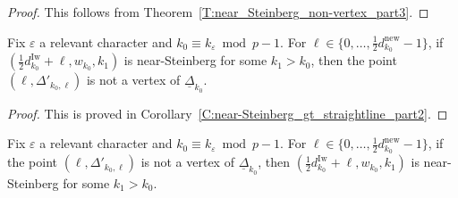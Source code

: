 \begin{proof}
    This follows from Theorem~\ref{T:near_Steinberg_non-vertex_part3}.
\end{proof}

\begin{proposition}
    \label{P:vertices_of_Deltak_part1}
    Fix $\varepsilon$ a relevant character and $k_0 \equiv k_\varepsilon \bmod p-1$.
    For $\ell \in\{0, \dots, \frac12d_{k_0}^{\mathrm{new}}-1\}$, if $(\frac 12d_{k_0}^{\mathrm{Iw}}+ \ell, w_{k_0}, k_1)$ is near-Steinberg for some $k_1 > {k_0}$, then the point $(\ell, \Delta'_{{k_0},\ell})$ is not a vertex of $\underline \Delta_{k_0}$.
\end{proposition}

\begin{proof}
    This is proved in Corollary~\ref{C:near-Steinberg_gt_straightline_part2}.
\end{proof}

\begin{proposition}
    \label{P:vertices_of_Deltak_part2}
    Fix $\varepsilon$ a relevant character and $k_0 \equiv k_\varepsilon \bmod p-1$.
    For $\ell \in\{0, \dots, \frac12d_{k_0}^{\mathrm{new}}-1\}$, if the point $(\ell, \Delta'_{{k_0},\ell})$ is not a vertex of $\underline \Delta_{k_0}$, then $(\frac 12d_{k_0}^{\mathrm{Iw}}+ \ell, w_{k_0}, k_1)$ is near-Steinberg for some  $k_1 > {k_0}$.
\end{proposition}

